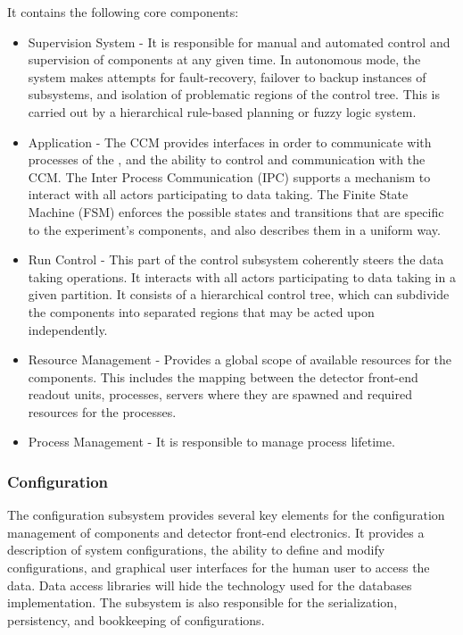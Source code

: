 It contains the following core components:
\begin{itemize}
\item Supervision System - It is responsible for manual and automated control and supervision of  components at any given time. In autonomous mode, the system makes attempts for fault-recovery, failover to backup instances of subsystems, and isolation of problematic regions of the control tree. This is carried out by a hierarchical rule-based planning or fuzzy logic system.
\item {} Application - The CCM provides interfaces in order to communicate with processes of the , and the ability to control and communication with the CCM. The Inter Process Communication (IPC) supports a mechanism to interact with all actors participating to data taking. The Finite State Machine (FSM) enforces the possible states and transitions that are specific to the experiment's components, and also describes them in a uniform way.
\item Run Control - This part of the control subsystem coherently steers the data taking operations. It interacts with all actors participating to data taking in a given partition. It consists of a hierarchical control tree, which can subdivide the  components into separated regions that may be acted upon independently.
\item Resource Management - Provides a global scope of available resources for the  components. This includes the mapping between the detector front-end readout units, processes, servers where they are spawned and required resources for the processes.
\item Process Management - It is responsible to manage process lifetime.
\end{itemize}

\subsubsection{Configuration}
\label{sec:daq:design:ccm:configuration}

The configuration subsystem provides several key elements for the configuration management of  components and detector front-end electronics. It provides a description of system configurations, the ability to define and modify configurations, and graphical user interfaces for the human user to access the data. Data access libraries will hide the technology used for the databases implementation. The subsystem is also responsible for the serialization, persistency, and bookkeeping of configurations. 

